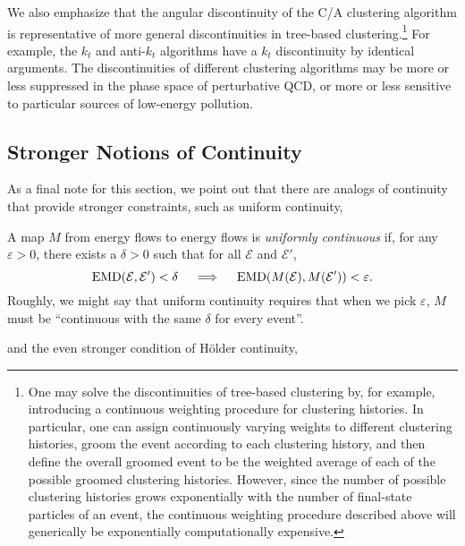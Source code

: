 \documentclass[letterpaper,11pt]{article}
\begin{document}
We also emphasize that the angular discontinuity of the C/A clustering algorithm is representative of more general discontinuities in tree-based clustering.\footnote{
One may solve the discontinuities of tree-based clustering by, for example, introducing a continuous weighting procedure for clustering histories. In particular, one can assign continuously varying weights to different clustering histories, groom the event according to each clustering history, and then define the overall groomed event to be the weighted average of each of the possible groomed clustering histories.
%
However, since the number of possible clustering histories grows exponentially with the number of final-state particles of an event, the continuous weighting procedure described above will generically be exponentially computationally expensive.
}
%
For example, the \(k_t\) and anti-\(k_t\) algorithms have a \(k_t\) discontinuity by identical arguments.
%
The discontinuities of different clustering algorithms may be more or less suppressed in the phase space of perturbative QCD, or more or less sensitive to particular sources of low-energy pollution.


\subsection{Stronger Notions of Continuity}
As a final note for this section, we point out that there are analogs of continuity that provide stronger constraints, such as uniform continuity,

\begin{definition}\label{def:eventuniformcontinuity}
A map \(M\) from energy flows to energy flows is \textit{uniformly continuous} if, for any \(\varepsilon > 0\), there exists a \(\delta > 0\) such that for all \(\mathcal{E}\) and \(\mathcal E'\),
%
\begin{equation*}\label{eqn:emduniformcontinuity}
    {\rm EMD}(\mathcal E,\mathcal E')<\delta
    \quad\implies\quad
    {\rm EMD}(M(\mathcal E), M(\mathcal E')) < \varepsilon.
\end{equation*}
%
Roughly, we might say that uniform continuity requires that when we pick \(\varepsilon\), \(M\) must be ``continuous with the same \(\delta\) for every event''.
\end{definition}

\noindent
and the even stronger condition of H\"older continuity,
\end{document}
